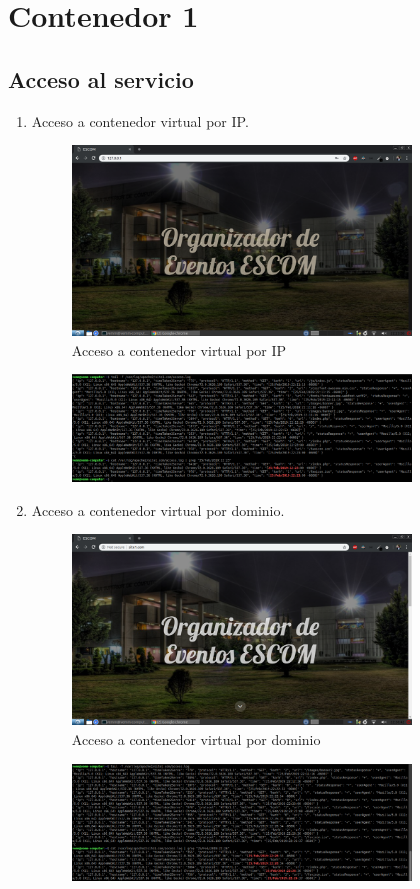 \section{Contenedor 1}
\subsection{Acceso al servicio}
	\begin{enumerate}
		\item Acceso a contenedor virtual por IP.
			\begin{figure}[htbp]
				\centering
				\includegraphics[width=9cm]{./img/lista/1.png}
				\caption[Acceso a contenedor virtual por IP]{Acceso a contenedor virtual por IP}
				\label{fig:1}
			\end{figure}
			\begin{figure}[htbp]
			\centering
				\includegraphics[width=9cm]{./img/lista/1_1.png}
				\label{fig:1.1}
			\end{figure}
		\item Acceso a contenedor virtual por dominio.
			\begin{figure}[htbp]
				\centering
				\includegraphics[width=9cm]{./img/lista/2.png}
				\caption[Acceso a contenedor virtual por dominio]{Acceso a contenedor virtual por dominio}
				\label{fig:2}
			\end{figure}
			\begin{figure}[htbp]
			\centering
				\includegraphics[width=9cm]{./img/lista/2_1.png}
				\label{fig:2.1}
			\end{figure}
	\end{enumerate}

